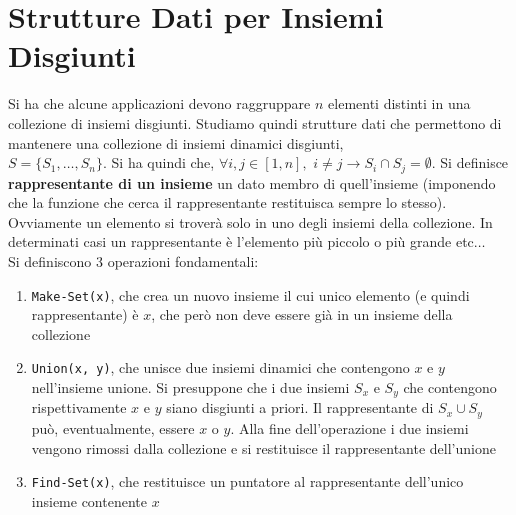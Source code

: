 \documentclass[a4paper,12pt, oneside]{book}
\begin{document}
\section{Strutture Dati per Insiemi Disgiunti}
Si ha che alcune applicazioni devono raggruppare $n$ elementi distinti
in una collezione di insiemi disgiunti. Studiamo quindi strutture dati
che permettono di mantenere una collezione di insiemi dinamici
disgiunti, \\
$S=\{S_1,\ldots, S_n\}$. Si ha quindi che, $\forall i,j
\in[1,n],\,\,i\neq j\to S_i \cap S_j=\emptyset$. Si definisce
\textbf{rappresentante di un insieme} un dato membro di
quell'insieme (imponendo che la funzione che cerca il rappresentante
restituisca sempre lo stesso). Ovviamente un elemento si troverà solo
in uno degli insiemi della collezione. In determinati casi un
rappresentante è l'elemento più piccolo o più grande etc$\ldots$\\
Si definiscono 3 operazioni fondamentali:
\begin{enumerate}
  \item \texttt{Make-Set(x)}, che crea un nuovo insieme il cui unico
  elemento (e quindi rappresentante) è $x$, che però non deve essere
  già in un insieme della collezione
  \item \texttt{Union(x, y)}, che unisce due insiemi dinamici che
  contengono $x$ e $y$ nell'insieme unione. Si presuppone che i due
  insiemi $S_x$ e $S_y$ che contengono rispettivamente $x$ e $y$ siano
  disgiunti a priori. Il rappresentante di $S_x\cup S_y$ può,
  eventualmente, essere $x$ o $y$. Alla fine dell'operazione i due
  insiemi vengono rimossi dalla collezione e si restituisce il
  rappresentante dell'unione
  \item \texttt{Find-Set(x)}, che restituisce un puntatore al
  rappresentante dell'unico insieme contenente $x$
\end{enumerate}
\end{document}
